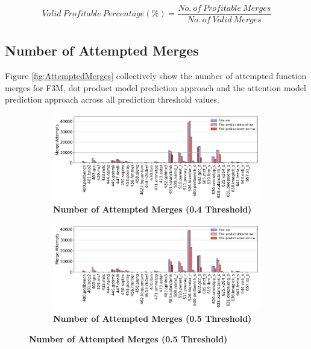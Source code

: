 \begin{equation} \label{METRIC:ValidProfitablePercentage}
    Valid\ Profitable\ Percentage (\%)=\frac{No.\ of\ Profitable\ Merges}{No.\ of\ Valid\ Merges}
\end{equation}


\subsection{Number of Attempted Merges}
Figure \ref{fig:AttemptedMerges} collectively show the number of attempted function merges for F3M, dot product model prediction approach and the attention model prediction approach across all prediction threshold values.

\begin{figure}[tbh!]
    \centering
    \begin{subfigure}{\textwidth}
        \centering
        \includegraphics[scale=0.47]{Figures/Valid_Merging_Predictions/0.4_MergeAttempts.png}
        \caption{\textbf{Number of Attempted Merges (\textbf{0.4} Threshold)}} 
        \label{fig:0.4AttemptedMerges}
    \end{subfigure}
    \begin{subfigure}{\textwidth}
        \centering
        \includegraphics[scale=0.47]{Figures/Valid_Merging_Predictions/0.5_MergeAttempts.png}
        \caption{\textbf{Number of Attempted Merges (\textbf{0.5} Threshold)}} 
        \label{fig:0.5AttemptedMerges}

\end{subfigure}
\end{figure}

